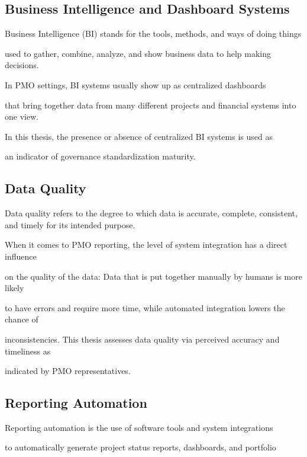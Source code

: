   

\subsection{Business Intelligence and Dashboard Systems} 

Business Intelligence (BI) stands for the tools, methods, and ways of doing things   

used to gather, combine, analyze, and show business data to help making decisions. 

\cite{negash2004} In PMO settings, BI systems usually show up as centralized dashboards  

that bring together data from many different projects and financial systems into one view.  

In this thesis, the presence or absence of centralized BI systems is used as  

an indicator of governance standardization maturity. 

  

\subsection{Data Quality} 

Data quality refers to the degree to which data is accurate, complete, consistent, and timely for its intended purpose. \cite{dama2017}

When it comes to PMO reporting, the level of system integration has a direct influence 

 on the quality of the data: Data that is put together manually by humans is more likely 

 to have errors and require more time, while automated integration lowers the chance of 

 inconsistencies. This thesis assesses data quality via perceived accuracy and timeliness as 

 indicated by PMO representatives. 

  

\subsection{Reporting Automation} 

Reporting automation is the use of software tools and system integrations  

to automatically generate project status reports, dashboards, and portfolio  

